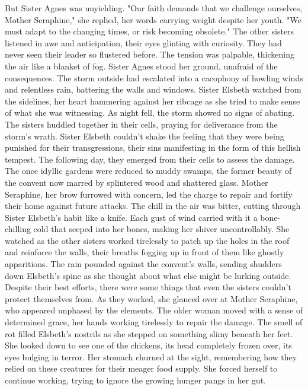 \documentclass[11pt]{article}
\begin{document}
But Sister Agnes was unyielding. "Our faith demands that we challenge ourselves, Mother Seraphine," she replied, her words carrying weight despite her youth. "We must adapt to the changing times, or risk becoming obsolete."
The other sisters listened in awe and anticipation, their eyes glinting with curiosity. They had never seen their leader so flustered before. The tension was palpable, thickening the air like a blanket of fog. Sister Agnes stood her ground, unafraid of the consequences.
The storm outside had escalated into a cacophony of howling winds and relentless rain, battering the walls and windows.
Sister Elsbeth watched from the sidelines, her heart hammering against her ribcage as she tried to make sense of what she was witnessing.
As night fell, the storm showed no signs of abating. The sisters huddled together in their cells, praying for deliverance from the storm's wrath. Sister Elsbeth couldn't shake the feeling that they were being punished for their transgressions, their sins manifesting in the form of this hellish tempest.
The following day, they emerged from their cells to assess the damage. The once idyllic gardens were reduced to muddy swamps, the former beauty of the convent now marred by splintered wood and shattered glass. Mother Seraphine, her brow furrowed with concern, led the charge to repair and fortify their home against future attacks.
The chill in the air was bitter, cutting through Sister Elsbeth's habit like a knife. Each gust of wind carried with it a bone-chilling cold that seeped into her bones, making her shiver uncontrollably. She watched as the other sisters worked tirelessly to patch up the holes in the roof and reinforce the walls, their breaths fogging up in front of them like ghostly apparitions.
The rain pounded against the convent's walls, sending shudders down Elsbeth's spine as she thought about what else might be lurking outside. Despite their best efforts, there were some things that even the sisters couldn't protect themselves from. As they worked, she glanced over at Mother Seraphine, who appeared unphased by the elements. The older woman moved with a sense of determined grace, her hands working tirelessly to repair the damage.
The smell of rot filled Elsbeth's nostrils as she stepped on something slimy beneath her feet. She looked down to see one of the chickens, its head completely frozen over, its eyes bulging in terror. Her stomach churned at the sight, remembering how they relied on these creatures for their meager food supply. She forced herself to continue working, trying to ignore the growing hunger pangs in her gut.
\end{document}

